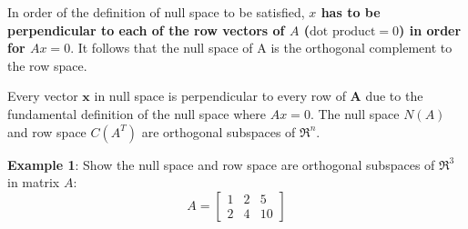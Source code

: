 \documentclass[10pt,a4paper]{article}
\begin{document}
In order of the definition of null space to be satisfied, \textbf{$x$ has to be perpendicular to
each of the row vectors of $A$ ($\text{dot product} = 0$) in order for $Ax = 0$}. It follows that the null space of A is the orthogonal complement to the row space.


\begin{tcolorbox}[breakable,colback=white]
Every vector $\textbf{x}$ in null space is perpendicular to every row of $\textbf{A}$ due to the
fundamental definition of the null space where $Ax=0$. The null space $N(A)$ and row space $C(A^T)$ are orthogonal subspaces of $\Re^n$.
\end{tcolorbox}

\textbf{Example 1}: Show the null space and row space are orthogonal subspaces of $\Re^3$ in matrix $A$:
$$A= \begin{bmatrix}
	1 & 2 & 5\\ 
	2 & 4 & 10
	\end{bmatrix} $$
\end{document}
